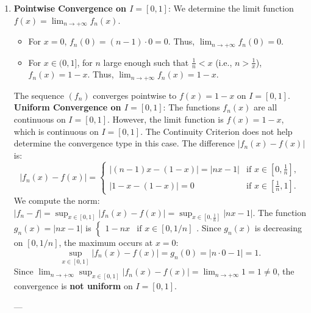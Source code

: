 \documentclass[12pt]{article}
\begin{document}
\begin{correctionbox}
\begin{enumerate}
    \item \textbf{Pointwise Convergence on $I=[0, 1]$}:
    We determine the limit function $f(x) = \lim_{n \to +\infty} f_n(x)$.
    \begin{itemize}
        \item For $x=0$, $f_n(0) = (n-1)\cdot 0 = 0$. Thus, $\lim_{n \to +\infty} f_n(0) = 0$.
        \item For $x \in (0, 1]$, for $n$ large enough such that $\frac{1}{n} < x$ (i.e., $n > \frac{1}{x}$), $f_n(x) = 1-x$.
        Thus, $\lim_{n \to +\infty} f_n(x) = 1-x$.
    \end{itemize}
    The sequence $(f_n)$ converges pointwise to $f(x) = 1-x$ on $I=[0, 1]$.
    \textbf{Uniform Convergence on $I=[0, 1]$}:
    The functions $f_n(x)$ are all continuous on $I=[0, 1]$.
    However, the limit function is $f(x) = 1-x$, which is continuous on $I=[0, 1]$. The Continuity Criterion does not help determine the convergence type in this case.
    The difference $|f_n(x) - f(x)|$ is:
    $$ |f_n(x) - f(x)| = \begin{cases}
        |(n-1)x - (1-x)| = |nx - 1| & \text{if } x \in \left[0, \frac{1}{n}\right], \\
        |1-x - (1-x)| = 0 & \text{if } x \in \left[\frac{1}{n}, 1\right].
    \end{cases} $$
    We compute the norm: $|f_n - f| = \sup_{x \in [0, 1]} |f_n(x) - f(x)| = \sup_{x \in [0, \frac{1}{n}]} |nx - 1|$.
    The function $g_n(x) = |nx - 1|$ is $\begin{cases} 1-nx & \text{if } x \in [0, 1/n] \end{cases}$.
    Since $g_n(x)$ is decreasing on $[0, 1/n]$, the maximum occurs at $x=0$:
    $$ \sup_{x \in [0, 1]} |f_n(x) - f(x)| = g_n(0) = |n\cdot 0 - 1| = 1. $$
    Since $\lim_{n \to +\infty} \sup_{x \in [0, 1]} |f_n(x) - f(x)| = \lim_{n \to +\infty} 1 = 1 \neq 0$, the convergence is \textbf{not uniform} on $I=[0, 1]$.

    ---
    

\end{enumerate}
\end{correctionbox}
\end{document}
